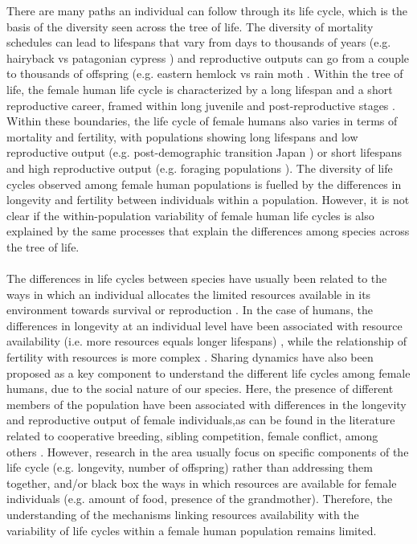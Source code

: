 \documentclass{article}
\begin{document}
There are many paths an individual can follow through its life cycle, which is the basis of the diversity seen across the tree of life. The diversity of mortality schedules can lead to lifespans that vary from days to thousands of years (e.g. hairyback vs patagonian cypress \citep{balsamo1988life,lara19933620}) and reproductive outputs can go from a couple to thousands of offspring (e.g. eastern hemlock vs rain moth \citep{tindale1932revision,van2017lifetime}. Within the tree of life, the female human life cycle is characterized by a long lifespan and a short reproductive career, framed within long juvenile and post-reproductive stages \citep{kaplan2000theory}. Within these boundaries, the life cycle of female humans also varies in terms of mortality and fertility, with populations showing long lifespans and low reproductive output (e.g. post-demographic transition Japan \citep{de2017maximum}) or short lifespans and high reproductive output (e.g. foraging populations \citep{migliano2007life}). The diversity of life cycles observed among female human populations is fuelled by the differences in longevity and fertility between individuals within a population. However, it is not clear if the within-population variability of female human life cycles is also explained by the same processes that explain the differences among species across the tree of life. 
\\\\
The differences in life cycles between species have usually been related to the ways in which an individual allocates the limited resources available in its environment towards survival or reproduction \citep{stearns2000life}. In the case of humans, the differences in longevity at an individual level have been associated with resource availability (i.e. more resources equals longer lifespans) \citep{kaplan2003embodied}, while the relationship of fertility with resources is more complex \citep{mulder1998demographic,sear2016understanding}. Sharing dynamics have also been proposed as a key component to understand the different life cycles among female humans, due to the social nature of our species. Here, the presence of different members of the population have been associated with differences in the longevity and reproductive output of female individuals,as can be found in the literature related to cooperative breeding, sibling competition, female conflict, among others \citep{ivey2000cooperative,nitsch2013elder,mace2012female,sear2011much}. However, research in the area usually focus on specific components of the life cycle (e.g. longevity, number of offspring) rather than addressing them together, and/or black box the ways in which resources are available for female individuals (e.g. amount of food, presence of the grandmother). Therefore, the understanding of the mechanisms linking resources availability with the variability of life cycles within a female human population remains limited.
\end{document}
